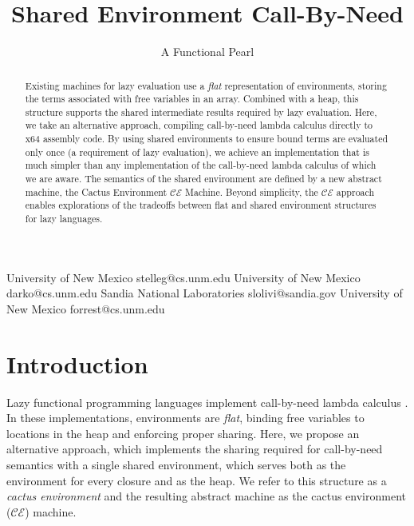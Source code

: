 \documentclass[preprint]{sigplanconf}
\begin{document}
\title{Shared Environment Call-By-Need}
\subtitle{A Functional Pearl}

           {University of New Mexico}
           {stelleg@cs.unm.edu}
           {University of New Mexico}
           {darko@cs.unm.edu}
           {Sandia National Laboratories}
           {slolivi@sandia.gov}
           {University of New Mexico}
           {forrest@cs.unm.edu}

\maketitle

\begin{abstract}
  Existing machines for lazy evaluation use a \emph{flat}
  representation of environments, storing the terms associated with
  free variables in an array.  Combined with a heap, this structure
  supports the shared intermediate results required by lazy
  evaluation.  Here, we take an alternative approach, compiling
  call-by-need lambda calculus directly to x64 assembly code.  By
  using shared environments to ensure bound terms are evaluated only
  once (a requirement of lazy evaluation), we achieve an
  implementation that is much simpler than any implementation of the
  call-by-need lambda calculus of which we are aware.  The semantics
  of the shared environment are defined by a new abstract machine, the Cactus
  Environment $\mathcal{CE}$ Machine.  Beyond simplicity, the $\mathcal{CE}$
  approach enables explorations of the tradeoffs between flat and shared 
  environment structures for lazy languages.


\end{abstract}

\section{Introduction} \label{sec:intro}

Lazy functional programming languages implement call-by-need lambda calculus
\cite{ariola1995call}. In these implementations, environments are \emph{flat},
binding free variables to locations in the heap and enforcing proper sharing.
Here, we propose an alternative approach, which implements the sharing required
for call-by-need semantics with a single
shared environment, which serves both as the environment for every
closure and as the heap. We refer to this structure as a \emph{cactus
environment} and the resulting abstract machine as the cactus
environment ($\mathcal{CE}$) machine.
\end{document}
